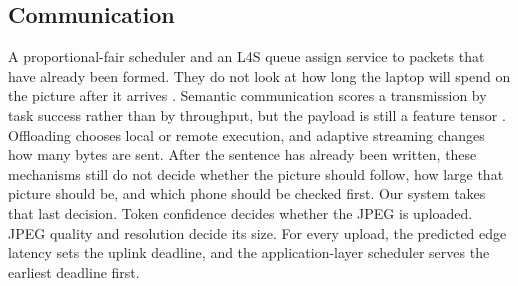 \subsection{Communication}
A proportional-fair scheduler and an L4S queue assign service to packets
that have already been formed. They do not look at how long the laptop will
spend on the picture after it arrives
\cite{jalali2000data,briscoe2023l4s}. Semantic communication scores a
transmission by task success rather than by throughput, but the payload is
still a feature tensor \cite{xie2021deep}. Offloading chooses local or
remote execution, and adaptive streaming changes how many bytes are sent.
After the sentence has already been written, these mechanisms still do not
decide whether the picture should follow, how large that picture should be,
and which phone should be checked first.
Our system takes that last decision. Token confidence decides whether the
JPEG is uploaded. JPEG quality and resolution decide its size. For every
upload, the predicted edge latency sets the uplink deadline, and the
application-layer scheduler serves the earliest deadline first.

